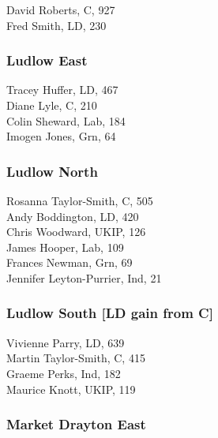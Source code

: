 \documentclass[a4paper,openany,10pt]{book}
\begin{document}
David Roberts, C, 927\\
Fred Smith, LD, 230\\


\subsubsection*{Ludlow East}



Tracey Huffer, LD, 467\\
Diane Lyle, C, 210\\
Colin Sheward, Lab, 184\\
Imogen Jones, Grn, 64\\


\subsubsection*{Ludlow North}



Rosanna Taylor-Smith, C, 505\\
Andy Boddington, LD, 420\\
Chris Woodward, UKIP, 126\\
James Hooper, Lab, 109\\
Frances Newman, Grn, 69\\
{Jennifer Leyton-Purrier}, Ind, 21\\


\subsubsection*{Ludlow South \hspace*{\fill}\nolinebreak[1]%
\enspace\hspace*{\fill}
[LD gain from C]}



Vivienne Parry, LD, 639\\
Martin Taylor-Smith, C, 415\\
Graeme Perks, Ind, 182\\
Maurice Knott, UKIP, 119\\


\subsubsection*{Market Drayton East}
\end{document}
